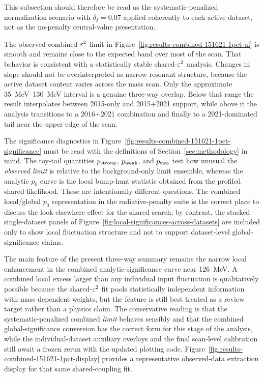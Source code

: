 This subsection should therefore be read as the systematic-penalized normalization
scenario with $\delta_f=0.07$ applied coherently to each active dataset, not as the
no-penalty central-value presentation.

The observed combined $\varepsilon^2$ limit in Figure~\ref{fig:results-combined-151621-1pct-ul}
is smooth and remains close to the expected band over most of the scan. That behavior
is consistent with a statistically stable shared-$\varepsilon^2$ analysis. Changes in slope
should not be overinterpreted as narrow resonant structure, because the active dataset
content varies across the mass scan. Only the approximate \SIrange{35}{130}{MeV}
interval is a genuine three-way overlap. Below that range the result interpolates
between 2015-only and 2015$+$2021 support, while above it the analysis transitions to a
2016$+$2021 combination and finally to a 2021-dominated tail near the upper edge of the
scan.

The significance diagnostics in Figure~\ref{fig:results-combined-151621-1pct-significance}
must be read with the definitions of Section~\ref{sec:methodology} in mind. The toy-tail
quantities $p_{\rm strong}$, $p_{\rm weak}$, and $p_{\rm two}$ test how unusual the
\emph{observed limit} is relative to the background-only limit ensemble, whereas the
analytic $p_0$ curve is the local bump-hunt statistic obtained from the profiled shared
likelihood. These are intentionally different questions. The combined local/global
$p_0$ representation in the radiative-penalty suite is the correct place to discuss the
look-elsewhere effect for the shared search; by contrast, the stacked single-dataset
panels of Figure~\ref{fig:local-significances-across-datasets} are included only to
show local fluctuation structure and not to support dataset-level global-significance
claims.

The main feature of the present three-way summary remains the narrow local enhancement
in the combined analytic-significance curve near \SI{126}{MeV}. A combined local excess
larger than any individual input fluctuation is qualitatively possible because the
shared-$\varepsilon^2$ fit pools statistically independent information with mass-dependent
weights, but the feature is still best treated as a review target rather than a
physics claim. The conservative reading is that the systematic-penalized combined
\emph{limit} behaves sensibly and that the combined global-significance conversion has
the correct form for this stage of the analysis, while the individual-dataset auxiliary
overlays and the final scan-level calibration still await a frozen rerun with the
updated plotting code. Figure~\ref{fig:results-combined-151621-1pct-display} provides a
representative observed-data extraction display for that same shared-coupling fit.

